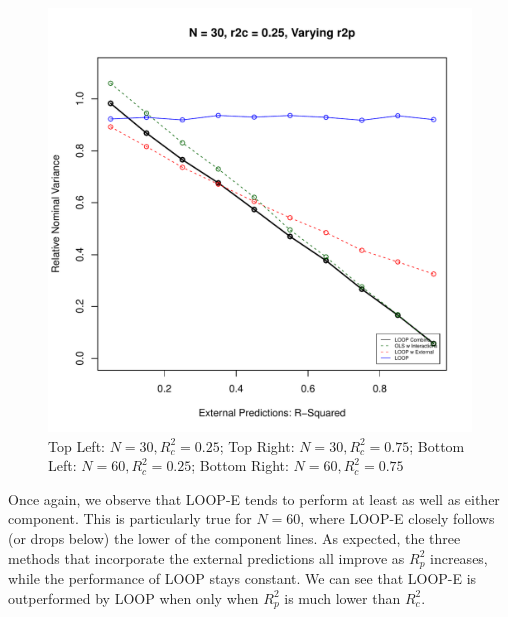 \begin{figure}[H]
	\includegraphics[width=.49\linewidth,page = 4]{images/r2p.pdf} \quad
	\caption{Top Left: $N = 30, R^2_c = 0.25$; Top Right: $N = 30, R^2_c = 0.75$; Bottom Left: $N = 60, R^2_c = 0.25$; Bottom Right: $N = 60, R^2_c = 0.75$}  
\end{figure}
Once again, we observe that LOOP-E tends to perform at least as well as either component. This is particularly true for $N=60$, where LOOP-E closely follows (or drops below) the lower of the component lines. As expected, the three methods that incorporate the external predictions all improve as $R^2_p$ increases, while the performance of LOOP stays constant. We can see that LOOP-E is outperformed by LOOP when only when $R^2_p$ is much lower than $R^2_c$. 

